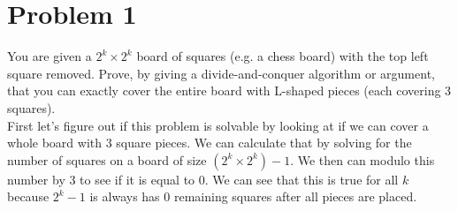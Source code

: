 \documentclass[12pt,letterpaper]{article}
\begin{document}
\section*{Problem 1}
You are given a $2^k\times2^k$ board of squares (e.g. a chess board) with the top left square removed.
Prove, by giving a divide-and-conquer algorithm or argument, that you can exactly cover the
entire board with L-shaped pieces (each covering 3 squares).
\\[22pt]
First let's figure out if this problem is solvable by looking at if we 
can cover a whole board with 3 square pieces. We can calculate that by 
solving for the number of squares on a board of size $(2^k\times2^k) - 1$.
We then can modulo this number by 3 to see if it is equal to 0. We can
see that this is true for all $k$ because $2^k-1$ is always has 0 remaining
squares after all pieces are placed. 
\end{document}
